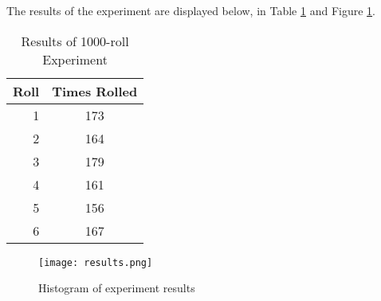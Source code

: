 \documentclass[letterpaper]{article}
\begin{document}
The results of the experiment are displayed below, in Table \ref{tbl:results} and Figure \ref{fig:experimentResults}.


\begin{table}[h!]
    \centering
    \begin{tabular}{r||c}
    Roll	& Times Rolled\\
    \hline
    1	& 173\\
    2	& 164\\
    3	& 179\\
    4	& 161 \\
	5 & 156\\
	6 & 167\\
    \end{tabular}
    \caption{Results of 1000-roll Experiment}
    \label{tbl:results}
\end{table}

\begin{figure}[h!]
\centering
\texttt{[image: results.png]}
\caption{Histogram of experiment results}
\label{fig:experimentResults}
\end{figure}
\end{document}
